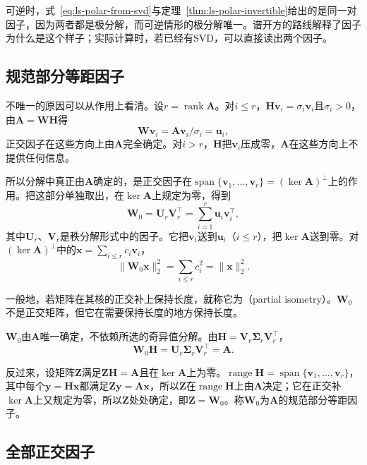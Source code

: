 可逆时，式~\eqref{eq:ls-polar-from-svd}与定理~\ref{thm:ls-polar-invertible}给出的是同一对因子，因为两者都是极分解，而可逆情形的极分解唯一。谱开方的路线解释了因子为什么是这个样子；实际计算时，若已经有SVD，可以直接读出两个因子。

\subsection{规范部分等距因子}
\label{sec:ls-polar-partial-isometry}

不唯一的原因可以从作用上看清。设$r=\operatorname{rank}\bm A$。对$i\leq r$，$\bm H\bm v_i=\sigma_i\bm v_i$且$\sigma_i>0$，由$\bm A=\bm W\bm H$得
\[
 \bm W\bm v_i=\bm A\bm v_i/\sigma_i=\bm u_i ,
\]
正交因子在这些方向上由$\bm A$完全确定。对$i>r$，$\bm H$把$\bm v_i$压成零，$\bm A$在这些方向上不提供任何信息。

所以分解中真正由$\bm A$确定的，是正交因子在$\operatorname{span}\{\bm v_1,\ldots,\bm v_r\}=(\ker\bm A)^\perp$上的作用。把这部分单独取出，在$\ker\bm A$上规定为零，得到
\begin{equation}
 \bm W_0=\bm U_r\bm V_r^\top=\sum_{i=1}^r\bm u_i\bm v_i^\top ,
 \label{eq:ls-polar-partial-isometry}
\end{equation}
其中$\bm U_r$、$\bm V_r$是秩分解形式中的因子。它把$\bm v_i$送到$\bm u_i$（$i\leq r$），把$\ker\bm A$送到零。对$(\ker\bm A)^\perp$中的$\bm x=\sum_{i\leq r}c_i\bm v_i$，
\[
 \lVert\bm W_0\bm x\rVert_2^2=\sum_{i\leq r}c_i^2=\lVert\bm x\rVert_2^2 .
\]

一般地，若矩阵在其核的正交补上保持长度，就称它为（partial isometry）。$\bm W_0$不是正交矩阵，但它在需要保持长度的地方保持长度。

$\bm W_0$由$\bm A$唯一确定，不依赖所选的奇异值分解。由$\bm H=\bm V_r\bm\Sigma_r\bm V_r^\top$，
\[
 \bm W_0\bm H=\bm U_r\bm\Sigma_r\bm V_r^\top=\bm A .
\]

反过来，设矩阵$\bm Z$满足$\bm Z\bm H=\bm A$且在$\ker\bm A$上为零。$\operatorname{range}\bm H=\operatorname{span}\{\bm v_1,\ldots,\bm v_r\}$，其中每个$\bm y=\bm H\bm x$都满足$\bm Z\bm y=\bm A\bm x$，所以$\bm Z$在$\operatorname{range}\bm H$上由$\bm A$决定；它在正交补$\ker\bm A$上又规定为零，所以$\bm Z$处处确定，即$\bm Z=\bm W_0$。称$\bm W_0$为$\bm A$的规范部分等距因子。

\subsection{全部正交因子}
\label{sec:ls-polar-all-orthogonal-factors}

